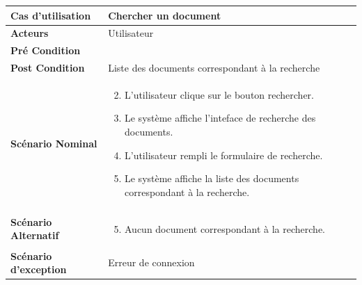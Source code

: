 \begin{longtable}{|p{5cm}|p{10cm}|}
\hline
\textbf{Cas d'utilisation}&Chercher un document\\
\hline
\textbf{Acteurs}&Utilisateur\\
\hline
\textbf{Pré Condition}&\\
\hline
\textbf{Post Condition}&Liste des documents correspondant à la recherche\\
\hline
\textbf{Scénario Nominal}&
\vspace{-\baselineskip}
\begin{enumerate}
    \setcounter{enumi}{1}
    \item L'utilisateur clique sur le bouton rechercher.
    \item Le système affiche l'inteface de recherche des documents.
    \item L'utilisateur rempli le formulaire de recherche.
    \item Le système affiche la liste des documents correspondant à la recherche.
\end{enumerate}\\
\hline
\textbf{Scénario Alternatif}&
\vspace{-\baselineskip}
\begin{enumerate}
    \setcounter{enumi}{4}
    \item Aucun document correspondant à la recherche.
\end{enumerate}\\
\hline
\textbf{Scénario d'exception}&Erreur de connexion\\
\hline
\end{longtable}


